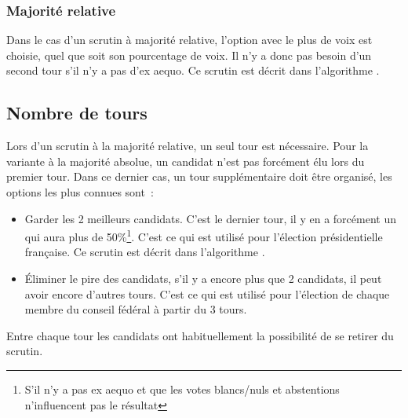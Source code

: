 \documentclass[../report]{subfiles}
\begin{document}
  \subsubsection{Majorité relative}
  Dans le cas d'un scrutin à majorité relative, l'option avec le plus de voix est choisie, 
  quel que soit son pourcentage de voix. Il n'y a donc pas besoin d'un second tour s'il n'y 
  a pas d'ex aequo. Ce scrutin est décrit dans l'algorithme .

  \begin{algorithm}
    \caption{Scrutin majoritaire uninominal à 1 tour}%
    \label{scrutin:maj-uni-1t}
    \begin{algorithmic}[1]
      \ENDFOR{}
    \end{algorithmic}
  \end{algorithm}


  \subsection{Nombre de tours}

  Lors d'un scrutin à la majorité relative, un seul tour est nécessaire.
  Pour la variante à la majorité absolue, un candidat n'est pas forcément élu lors du
  premier tour. Dans ce dernier cas, un tour supplémentaire doit être organisé, les options
  les plus connues sont~: 
  \begin{itemize}
    \item Garder les 2 meilleurs candidats. C'est le dernier tour, il y en a forcément un 
      qui aura plus de 50\%\footnote{S'il n'y a pas ex aequo et que les votes blancs/nuls 
      et abstentions n'influencent pas le résultat}. C'est ce qui est utilisé pour l'élection
      présidentielle française. Ce scrutin est décrit dans l'algorithme .
    \item Éliminer le pire des candidats, s'il y a encore plus que 2 candidats, il peut avoir
      encore d'autres tours. C'est ce qui est utilisé pour l'élection de chaque membre du
      conseil fédéral à partir du 3 tours.
  \end{itemize}

  Entre chaque tour les candidats ont habituellement la possibilité de se retirer du scrutin.
  
\end{document}
